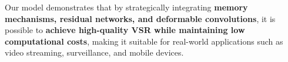 Our model demonstrates that by strategically integrating \textbf{memory mechanisms, residual networks, and deformable convolutions}, it is possible to \textbf{achieve high-quality VSR while maintaining low computational costs}, making it suitable for real-world applications such as video streaming, surveillance, and mobile devices.